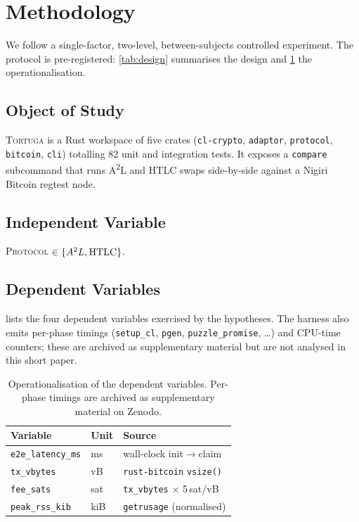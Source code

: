 \documentclass[sigconf,nonacm]{acmart}
\newcommand{\toolname}{\textsc{Tortuga}\xspace}
\newcommand{\atwol}{A\textsuperscript{2}L\xspace}
\newcommand{\code}[1]{\texttt{\small #1}}
\begin{document}
\section{Methodology}
\label{sec:method}

We follow a single-factor, two-level, between-subjects controlled experiment.
The protocol is pre-registered: \cref{tab:design} summarises the design and
\cref{tab:vars} the operationalisation.

\subsection{Object of Study}
\toolname is a Rust workspace of five crates (\code{cl-crypto},
\code{adaptor}, \code{protocol}, \code{bitcoin}, \code{cli}) totalling 82
unit and integration tests. It exposes a \code{compare} subcommand that runs
\atwol and HTLC swaps side-by-side against a Nigiri Bitcoin regtest node.

\subsection{Independent Variable}
\textsc{Protocol} $\in \{\atwol, \text{HTLC}\}$.

\subsection{Dependent Variables}
 lists the four dependent variables exercised by the
hypotheses. The harness also emits per-phase timings (\code{setup\_cl},
\code{pgen}, \code{puzzle\_promise}, \dots) and CPU-time counters; these
are archived as supplementary material but are not analysed in this short
paper.

\begin{table}[t]
	\small
	\caption{Operationalisation of the dependent variables. Per-phase
		timings are archived as supplementary material on Zenodo.}
	\label{tab:vars}
	\begin{tabular}{@{}lll@{}}
		\toprule
		Variable                & Unit & Source                               \\
		\midrule
		\code{e2e\_latency\_ms} & ms   & wall-clock init$\to$claim            \\
		\code{tx\_vbytes}       & vB   & \code{rust-bitcoin} \code{vsize()}   \\
		\code{fee\_sats}        & sat  & \code{tx\_vbytes} $\times$ 5\,sat/vB \\
		\code{peak\_rss\_kib}   & kiB  & \code{getrusage} (normalised)        \\
		\bottomrule
	\end{tabular}
\end{table}
\end{document}
